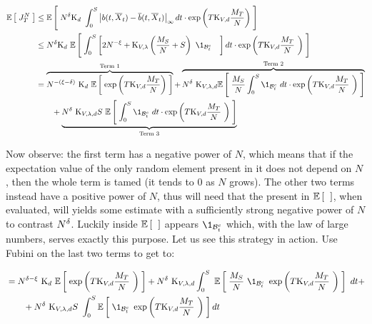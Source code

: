 \begin{equation}\label{ch6:3-terms before-estimates}
	\begin{aligned}
	\E{\auxProc_T^N}
	&\leq 
	\E{
		N^{\cutparameter}
		\const_d\
		\int_0^S
		\norm{\drift(t, \mfsol_t) - \mfdrift(t, \mfsol_t)}_\infty 
		dt
		\cdot
		\exp \left(
		T
		\const_{\attraction,d}
		\frac{\hmactive_T}{N}
		\right)
	}
	\\
	&\leq
	N^{\cutparameter}
	\const_d\
	\E{
		\int_0^S
		\left[
			2N^{-\xi}
			+
			\const_{\attraction, \lambda} 
			\left(
			\frac{\hmactive_S}{N}
			+
			S
			\right)\
			\1_{\setB_t^c}\quad
		\right]
		dt
		\cdot
		\exp \left(
		T\const_{\attraction,d}
		\frac{\hmactive_T}{N}\
		\right)
	}
	\\
	&= 
	\overbrace{
		N^{-(\xi-\cutparameter)}\
		\const_d\
		\E{
			\exp \left(
				T
				\const_{\attraction,d}
				\frac{\hmactive_T}{N}
			\right)
		}
	}^{\text{Term }1}
		+ 
		\overbrace{
		N^{\cutparameter}\
		\const_{\attraction, \lambda,d} 
		\E{
			\frac{\hmactive_S}{N} 
			\int_0^S
			\1_{\setB_t^c}\
			dt
			\cdot
			\exp \left(
			T
			\const_{\attraction,d}
			\frac{\hmactive_T}{N}\
			\right)
		}
	}^{\text{Term }2}
	\\
	&\qquad
		+ 
		\underbrace{
		N^{\cutparameter}\
		\const_{\attraction, \lambda,d}
		S\
			\E{
				\int_0^S
				\1_{\setB_t^c}\
				dt
				\cdot
				\exp \left(
				T
				\const_{\attraction,d}
				\frac{\hmactive_T}{N}\
				\right)
			}
		}_{\text{Term }3}
	\end{aligned}
\end{equation}

Now observe: the first term has a negative power of $N$, which means that if the expectation value of the only random element present in it does not depend on $N$, then the whole term is tamed (\ie it tends to $0$ as $N$ grows).
The other two terms instead have a positive power of $N$, thus will need that the \rv present in $\mathbb{E} \left[ \;  \; \right]$, when evaluated, will yields some estimate with a sufficiently strong negative power of $N$ to contrast $N^{\delta}$. 
Luckily inside $\mathbb{E} \left[ \;  \; \right]$ appears $\1_{\setB_t^c}$ which, with the law of large numbers, serves exactly this purpose.
Let us see this strategy in action.
Use Fubini on the last two terms to get to:

\begin{align*}
&=
N^{\cutparameter-\xi}\
\const_d\
\E{
	\exp \left(
	T
	\const_{\attraction,d}
	\frac{\hmactive_T}{N}\
	\right)
}
+ N^{\cutparameter}\
\const_{\attraction, \lambda,d}
\int_0^S\
\E{
	\frac{\hmactive_S}{N}\
	\1_{\setB_t^c}\
	\exp \left(
	T
	\const_{\attraction,d}
	\frac{\hmactive_T}{N}\
	\right)
}\
dt +
\\
&\qquad
+ N^{\cutparameter}\
\const_{\attraction, \lambda,d}
S\
\int_0^S
\E{
	\1_{\setB_t^c}\
	\exp \left(
	T
	\const_{\attraction,d}
	\frac{\hmactive_T}{N}\
	\right)
}
dt
\end{align*}

